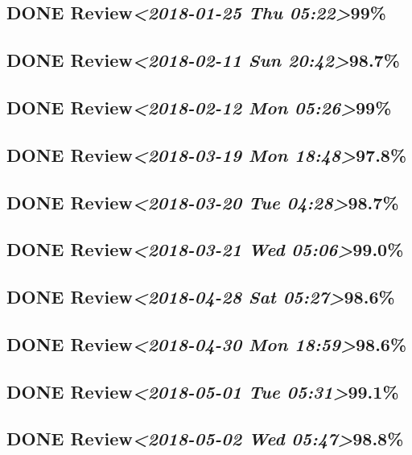 \documentclass[11pt]{ctexart}
\begin{document}
\subsection{{\bfseries\sffamily DONE} Review\textit{<2018-01-25 Thu 05:22>}99\%}
\label{sec:orgc041596}
\subsection{{\bfseries\sffamily DONE} Review\textit{<2018-02-11 Sun 20:42>}98.7\%}
\label{sec:org90d6d17}
\subsection{{\bfseries\sffamily DONE} Review\textit{<2018-02-12 Mon 05:26>}99\%}
\label{sec:org2110f37}
\subsection{{\bfseries\sffamily DONE} Review\textit{<2018-03-19 Mon 18:48>}97.8\%}
\label{sec:org0a88dc6}
\subsection{{\bfseries\sffamily DONE} Review\textit{<2018-03-20 Tue 04:28>}98.7\%}
\label{sec:org69efb4f}
\subsection{{\bfseries\sffamily DONE} Review\textit{<2018-03-21 Wed 05:06>}99.0\%}
\label{sec:orge3fb2a8}
\subsection{{\bfseries\sffamily DONE} Review\textit{<2018-04-28 Sat 05:27>}98.6\%}
\label{sec:org2e1c851}
\subsection{{\bfseries\sffamily DONE} Review\textit{<2018-04-30 Mon 18:59>}98.6\%}
\label{sec:orgd4e1740}
\subsection{{\bfseries\sffamily DONE} Review\textit{<2018-05-01 Tue 05:31>}99.1\%}
\label{sec:org9dcb839}
\subsection{{\bfseries\sffamily DONE} Review\textit{<2018-05-02 Wed 05:47>}98.8\%}
\label{sec:org6ec4cdc}
\end{document}
